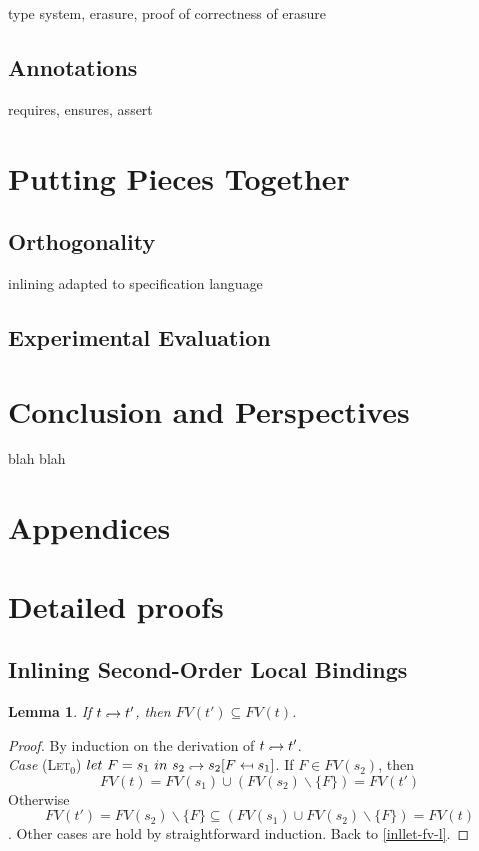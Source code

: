 \documentclass[a4paper,11pt,oneside]{article}
\theoremstyle{plain}
\newtheorem{lemma}[definition]{Lemma}
\newcommand{\tmlet}[3]{let~#1=#2~in~#3}
\newcommand{\tmsbst}[3]{#1 [#2 \mapsfrom #3] }
\newcommand{\hookdownarrow}{\mathrel{\rotatebox[origin=c]{180}{$\hookleftarrow$}}}
\newcommand{\inllet}[2]{#1 \hookdownarrow #2}
\begin{document}
type system, erasure, proof of correctness of erasure

\subsection{Annotations}

requires, ensures, assert

\section{Putting Pieces Together}

\subsection{Orthogonality}

inlining adapted to specification language

\subsection{Experimental Evaluation}

\section{Conclusion and Perspectives}

blah blah

\newpage
\section*{Appendices}
\newpage
\appendix
\section{Detailed proofs} 


	\subsection{Inlining Second-Order Local Bindings}
	
  \begin{lemma}
 	If $\inllet{t}{t'}$, then $FV(t') \subseteq FV(t)$.
 	\label{inllet-fv-p}
  \end{lemma}

\begin{proof}
 By induction on the derivation of $\inllet{t}{t'}$.  \\
 	\noindent\textit{Case} \textsc{(Let$_0$)}\quad 
 	$\tmlet{F}{s_1}{s_2} \hookdownarrow \tmsbst{s_2}{F}{s_1}$. 
 	If $F \in FV(s_2)$, then 
 	$$FV(t) = FV(s_1) \cup (FV(s_2) \backslash \{F\}) = FV(t') $$ 
 	Otherwise  
 	$$ FV(t') =  FV(s_2) \backslash \{F\} \subseteq (FV(s_1) \cup FV(s_2) \backslash \{F\}) =  FV(t)$$.
 Other cases are hold by straightforward induction. Back to \ref{inllet-fv-l}.
\end{proof}	
	
\end{document}
